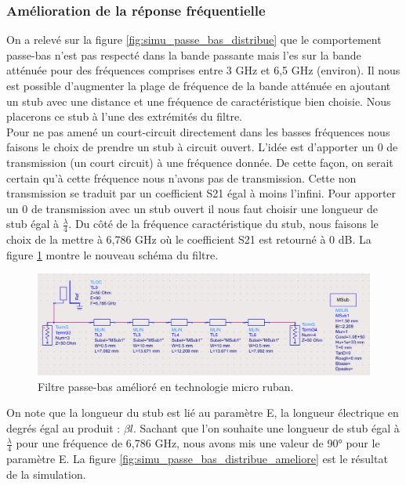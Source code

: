\documentclass[french]{article}
\begin{document}
\subsubsection{Amélioration de la réponse fréquentielle}

On a relevé sur la figure \ref{fig:simu_passe_bas_distribue} que le comportement passe-bas n'est pas respecté dans la bande passante mais l'es sur la bande atténuée pour des fréquences comprises entre 3 GHz et 6,5 GHz (environ). Il nous est possible d'augmenter la plage de fréquence de la bande atténuée en ajoutant un stub avec une distance et une fréquence de caractéristique bien choisie. Nous placerons ce stub à l'une des extrémités du filtre. \\

Pour ne pas amené un court-circuit directement dans les basses fréquences nous faisons le choix de prendre un stub à circuit ouvert. L'idée est d'apporter un 0 de transmission (un court circuit) à une fréquence donnée. De cette façon, on serait certain qu'à cette fréquence nous n'avons pas de transmission. Cette non transmission se traduit par un coefficient S21 égal à moins l'infini. Pour apporter un 0 de transmission avec un stub ouvert il nous faut choisir une longueur de stub égal à $\frac{\lambda}{4}$. Du côté de la fréquence caractéristique du stub, nous faisons le choix de la mettre à 6,786 GHz où le coefficient S21 est retourné à 0 dB. La figure \ref{fig:schema_distribue_ameliore_passe_bas_ads} montre le nouveau schéma du filtre.

\begin{figure}[H]
	\centering
	\includegraphics[width=15cm]{photo/passe_bas_vic/schema_distribue_ameliore_passe_bas_ads.png}
	\caption{Filtre passe-bas amélioré en technologie micro ruban.}
	\label{fig:schema_distribue_ameliore_passe_bas_ads}
\end{figure}

On note que la longueur du stub est lié au paramètre E, la longueur électrique en degrés égal au produit : $\beta l$. Sachant que l'on souhaite une longueur de stub égal à $\frac{\lambda}{4}$ pour une fréquence de 6,786 GHz, nous avons mis une valeur de 90° pour le paramètre E. La figure \ref{fig:simu_passe_bas_distribue_ameliore} est le résultat de la simulation.
\end{document}
